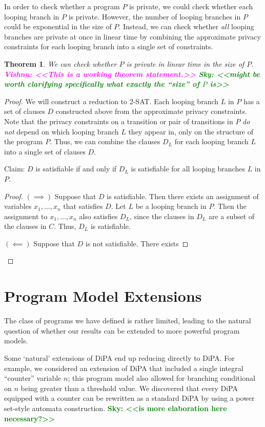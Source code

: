 \documentclass[12pt]{article}
\newcommand{\todo}[2]{\textcolor{#1}{\textbf{#2}}}
\newcommand{\sky}[1]{\todo{green}{Sky: <<#1>>}}
\newcommand{\vishnu}[1]{\todo{magenta}{Vishnu: <<#1>>}}
\newtheorem{thm}{Theorem}[section]
\theoremstyle{definition}
\begin{document}
In order to check whether a program $P$ is private, we could check whether each looping branch in $P$ is private. However, the number of looping branches in $P$ could be exponential in the size of $P$. Instead, we can check whether \textit{all} looping branches are private at once in linear time by combining the approximate privacy constraints for each looping branch into a single set of constraints.

\begin{thm}
    We can check whether $P$ is private in linear time in the size of $P$. \vishnu{This is a working theorem statement.} \sky{might be worth clarifying specifically what exactly the ``size'' of $P$ is}
\end{thm}

\begin{proof}
    We will construct a reduction to 2-SAT. Each looping branch $L$ in $P$ has a set of clauses $D$ constructed above from the approximate privacy constraints. Note that the privacy constraints on a transition or pair of transitions in $P$ \textit{do not} depend on which looping branch $L$ they appear in, only on the structure of the program $P$. Thus, we can combine the clauses $D_L$ for each looping branch $L$ into a single set of clauses $D$.
    
    Claim: $D$ is satisfiable if and only if $D_L$ is satisfiable for all looping branches $L$ in $P$. 

    \begin{proof}
        $(\implies)$ Suppose that $D$ is satisfiable. Then there exists an assignment of variables $x_1, \dots, x_n$ that satisfies $D$. Let $L$ be a looping branch in $P$. Then the assignment to $x_1, \dots, x_n$ also satisfies $D_L$, since the clauses in $D_L$ are a subset of the clauses in $C$. Thus, $D_L$ is satisfiable.

        $(\impliedby)$ Suppose that $D$ is not satisfiable. There exists 
    \end{proof}
\end{proof}

\section{Program Model Extensions}

The class of programs we have defined is rather limited, leading to the natural question of whether our results can be extended to more powerful program models. 

Some `natural' extensions of DiPA end up reducing directly to DiPA. For example, we considered an extension of DiPA that included a single integral ``counter'' variable $n$; this program model also allowed for branching conditional on $n$ being greater than a threshold value. 
We discovered that every DiPA equipped with a counter can be rewritten as a standard DiPA by using a power set-style automata construction. \sky{is more elaboration here necessary?}
\end{document}
